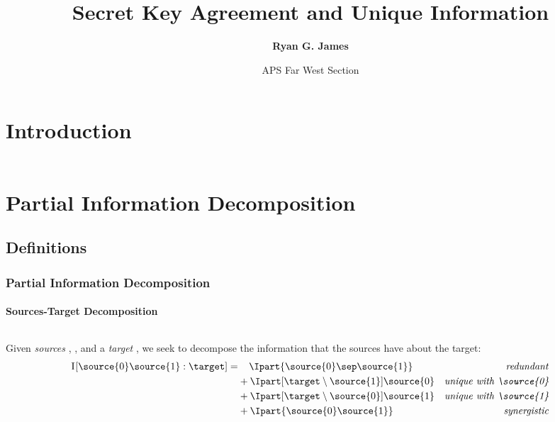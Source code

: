 \documentclass[final,serif,aspectratio=1610]{beamer}
\title{%
  \Huge Secret Key Agreement and Unique Information
}
\author[RGJ]{\Large\textbf{Ryan G. James}}
\institute[UCD]{%
  \csclogo
}
\date{%
  APS Far West Section \\
  \DTMusedate{date}
}
\begin{document}
\begin{frame}
  \titlepage
\end{frame}

\section{Introduction}

\begin{frame}
  \frametitle{}
  \framesubtitle{}
  \begin{columns}
    \begin{column}{1.0\textwidth}

    \end{column}
  \end{columns}
\end{frame}

\section{Partial Information Decomposition}

\subsection{Definitions}

\begin{frame}
  \frametitle{Partial Information Decomposition~\cite{williams2010nonnegative}}
  \framesubtitle{Sources-Target Decomposition}
  \begin{columns}
    \begin{column}{1.0\textwidth}
      \Large

      Given \emph{sources} , , and a \emph{target} \target, we seek to decompose the information that the sources have about the target:
      \begin{align*}
        \I{\source{0}\source{1} : \target} =
          & \phantom{+}~\Ipart{\source{0}\sep\source{1}}
          & \textrm{\emph{redundant}} \\
          & + \Ipart[\target \setminus \source{1}]{\source{0}}
          & \textrm{\emph{unique with \source{0}}} \\
          & + \Ipart[\target \setminus \source{0}]{\source{1}}
          & \textrm{\emph{unique with \source{1}}} \\
          & + \Ipart{\source{0}\source{1}}
          & \textrm{\emph{synergistic}}
        \label{eq:decomp}
      \end{align*}
    \end{column}
  \end{columns}
\end{frame}
\end{document}
